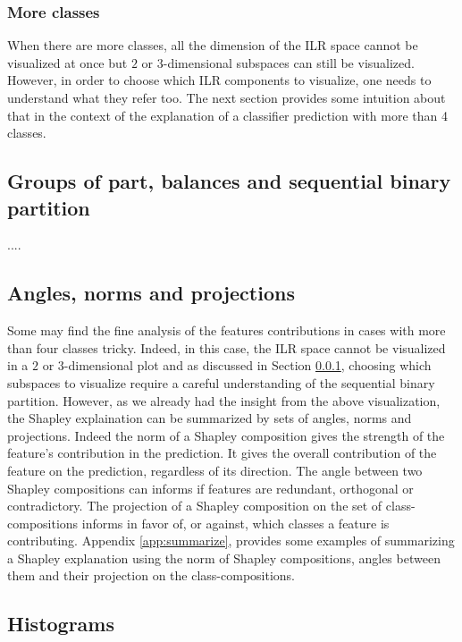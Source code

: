 \documentclass{article}
\theoremstyle{plain}
\theoremstyle{definition}
\theoremstyle{remark}
\begin{document}
\subsubsection{More classes}
\label{sec:moreclasses}
When there are more classes, all the dimension of the ILR space cannot be visualized at once but $2$ or $3$-dimensional subspaces can still be visualized. However, in order to choose which ILR components to visualize, one needs to understand what they refer too. The next section provides some intuition about that in the context of the explanation of a classifier prediction with more than 4 classes.

\subsection{Groups of part, balances and sequential binary partition}

....

\subsection{Angles, norms and projections}

Some may find the fine analysis of the features contributions in cases with more than four classes tricky. Indeed, in this case, the ILR space cannot be visualized in a $2$ or $3$-dimensional plot and as discussed in Section \ref{sec:moreclasses}, choosing which subspaces to visualize require a careful understanding of the sequential binary partition. However, as we already had the insight from the above visualization, the Shapley explaination can be summarized by sets of angles, norms and projections. Indeed the norm of a Shapley composition gives the strength of the feature's contribution in the prediction. It gives the overall contribution of the feature on the prediction, regardless of its direction. The angle between two Shapley compositions can informs if features are redundant, orthogonal or contradictory. The projection of a Shapley composition on the set of class-compositions informs in favor of, or against, which classes a feature is contributing. Appendix \ref{app:summarize}, provides some examples of summarizing a Shapley explanation using the norm of Shapley compositions, angles between them and their projection on the class-compositions.



\subsection{Histograms}
\end{document}
